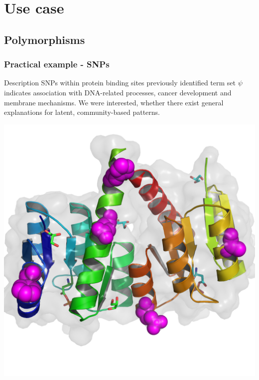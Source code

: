 \documentclass{beamer}
\begin{document}
  \section{Use case}
  \subsection{Polymorphisms}
  \begin{frame}\frametitle{Practical example - SNPs}

    \begin{block}{Description}
      SNPs within protein binding sites previously identified term set $\psi$ indicates association with DNA-related processes, cancer development and membrane mechanisms. We were interested, whether there exist general explanations for latent, community-based patterns.
    \end{block}

    \begin{center}
      \includegraphics[scale=0.35]{images/snps}
      \end{center}
  \end{frame}
\end{document}
